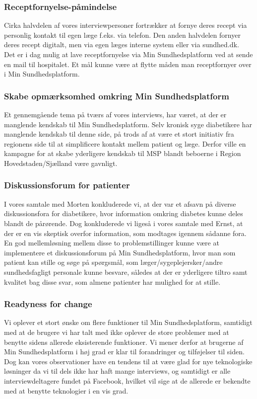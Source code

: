 \subsubsection{Receptfornyelse-påmindelse}
Cirka halvdelen af vores interviewpersoner fortrækker at fornye deres recept via personlig kontakt til egen læge f.eks. via telefon. Den anden halvdelen fornyer deres recept digitalt, men via egen læges interne system eller via sundhed.dk. \\
Det er i dag mulig at lave receptfornyelse via Min Sundhedsplatform ved at sende en mail til hospitalet. Et mål kunne være at flytte måden man receptfornyer over i Min Sundhedsplatform.

\subsubsection{Skabe opmærksomhed omkring Min Sundhedsplatform}
Et gennemgående tema på tværs af vores interviews, har været, at der er manglende kendskab til Min Sundhedsplatform. Selv kronisk syge diabetikere har manglende kendskab til denne side, på trods af at være et stort initiativ fra regionens side til at simplificere kontakt mellem patient og læge. Derfor ville en kampagne for at skabe yderligere kendskab til MSP blandt beboerne i Region Hovedstaden/Sjælland være gavnligt.

\subsubsection{Diskussionsforum for patienter}
I vores samtale med Morten konkluderede vi, at der var et afsavn på diverse diskussionsfora for diabetikere, hvor information omkring diabetes kunne deles blandt de pårørende.
Dog konkluderede vi ligeså i vores samtale med Ernst, at der er en vis skeptisk overfor information, som modtages igennem sådanne fora. En god mellemløsning mellem disse to problemstillinger kunne være at implementere et diskussionsforum på Min Sundhedsplatform, hvor man som patient kan stille og søge på spørgsmål, som læger/sygeplejersker/andre sundhedsfagligt personale kunne besvare, således at der er yderligere tiltro samt kvalitet bag disse svar, som almene patienter har mulighed for at stille.

\subsubsection{Readyness for change}
Vi oplever et stort ønske om flere funktioner til Min Sundhedsplatform, samtidigt med at de brugere vi har talt med ikke oplever de store problemer med at benytte sidens allerede eksisterende funktioner. Vi mener derfor at brugerne af Min Sundhedsplatform i høj grad er klar til forandringer og tilføjelser til siden.\\
Dog kan vores observationer have en tendens til at være glad for nye teknologiske løsninger da vi til dels ikke har haft mange interviews, og samtidigt er alle interviewdeltagere fundet på Facebook, hvilket vil sige at de allerede er bekendte med at benytte teknologier i en vis grad.
